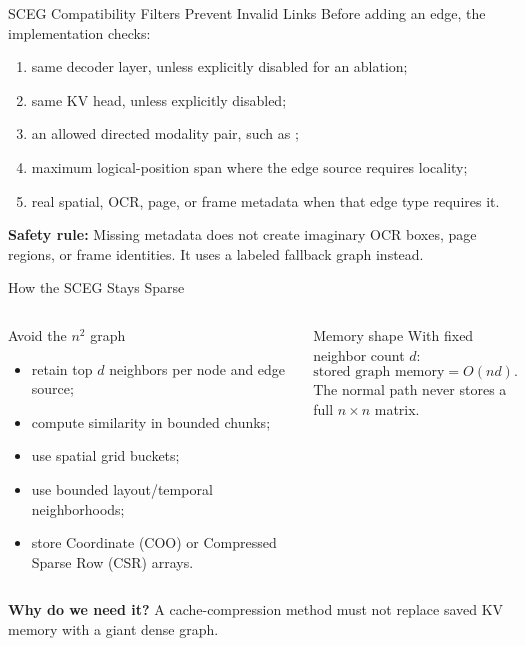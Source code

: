 \documentclass[aspectratio=169,10pt]{beamer}
\newcommand{\code}[1]{\texttt{\detokenize{#1}}}
\newcommand{\whylabel}{\textbf{Why do we need it?}}
\newcommand{\safetylabel}{\textbf{Safety rule:}}
\newcommand{\tightitems}{\setlength{\itemsep}{0.28em}\setlength{\parskip}{0pt}}
\begin{document}
\begin{frame}{SCEG Compatibility Filters Prevent Invalid Links}
\small
Before adding an edge, the implementation checks:
\begin{enumerate}\tightitems
  \item same decoder layer, unless explicitly disabled for an ablation;
  \item same KV head, unless explicitly disabled;
  \item an allowed directed modality pair, such as \code{text:image};
  \item maximum logical-position span where the edge source requires locality;
  \item real spatial, OCR, page, or frame metadata when that edge type requires it.
\end{enumerate}
\begin{alertblock}{\safetylabel}
Missing metadata does not create imaginary OCR boxes, page regions, or frame identities. It uses
a labeled fallback graph instead.
\end{alertblock}
\end{frame}

\begin{frame}{How the SCEG Stays Sparse}
\small
\begin{columns}[T,onlytextwidth]
\begin{block}{Avoid the $n^2$ graph}
\begin{itemize}\tightitems
  \item retain top $d$ neighbors per node and edge source;
  \item compute similarity in bounded chunks;
  \item use spatial grid buckets;
  \item use bounded layout/temporal neighborhoods;
  \item store Coordinate (COO) or Compressed Sparse Row (CSR) arrays.
\end{itemize}
\end{block}
\begin{exampleblock}{Memory shape}
With fixed neighbor count $d$:
\[
\text{stored graph memory}=O(nd).
\]
The normal path never stores a full $n\times n$ matrix.
\end{exampleblock}
\end{columns}
\begin{alertblock}{\whylabel}
A cache-compression method must not replace saved KV memory with a giant dense graph.
\end{alertblock}
\end{frame}
\end{document}
